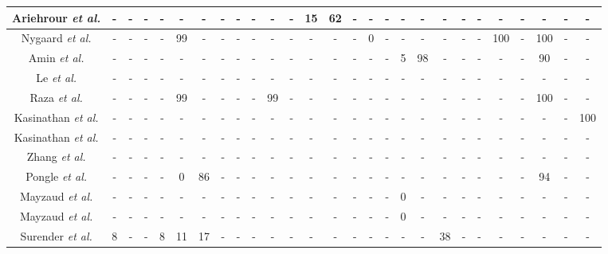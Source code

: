 \documentclass[10pt,journal,sort & compress]{IEEEtran}
\begin{document}
\begin{landscape}
\begin{longtable}{|c|c|c|c|c|c|c|c|c|c|c|c|c|c|c|c|c|c|c|c|c|c|c|c|c|c|c|}
		Ariehrour \textit{et al.}\cite{Airehrour2018}  & - &   -&-  & - &-  & - & - & - & - & - & - &  15& 62 &-  &-  & - & - & - & - & - &  -&  -& - & - & - & -  \\ \hline
		Nygaard \textit{et al.}\cite{nygaard2017intrusion} &-  &   -&  -&  -& 99 & - & - &  -&  -&-  & - & - & -  &    - &  0& - & - &-  &- & -  &  -& 100 & - & 100  & -& -\\ \hline
		Amin \textit{et al.}\cite{RIDES} & -  & - & - & - & - & - &-  &-  &-  & - & - &  -&-  &-  &-  & -  & 5 &  98& - &  -& - & - & - & 90  & -& -\\ \hline
		Le \textit{et al.}\cite{Le2011} & -  & - & - & - & - & - & - & - & - & - & - & - & - & - & - &  - & - & -  & - & - & - & - & - & -  & - &  -\\ \hline
		Raza \textit{et al.}\cite{RAZA20132661} & - &  -&-  & - & 99 & - & - &  -& - & 99 & - &  -& - & - & - &  -&-  &  - & - & - &  - & - &-  & 100  & - & -\\ \hline
		Kasinathan \textit{et al.}\cite{kasinathan2013denial} &-  &  - & - & - &  -& - & - & - & - & - &  -&-  & - &   -& - &-  & - & - &  -&-  &-  &- & - & -   & - & 100\\ \hline
		Kasinathan \textit{et al.}\cite{kasinathan2013ids} & - & - & - &  -&  -& - & - & - & - &-  &-  & - & - &-  &  - & - & - &  -& - & -  &  -&  - &-  &-    &- & - \\ \hline
		Zhang \textit{et al.}\cite{zhang2015intrusion}  & - &  - & - &  -&  -& - & - & - & - &-  &-  & - & - &-  &  - & - & - &  -& - & - &  -& - &-  &-    &- & - \\ \hline
		Pongle \textit{et al.}\cite{pongle2015real} & - &  - &-  &-  & 0 & 86 & - & - & - &  -&-   &  -& - & - &  -& - & -   & - & - &  -& - &-  & - & 94 & - & - \\ \hline
		Mayzaud \textit{et al.}\cite{Mayzaud2016Version} &  -&-  &  - & - & - & - &  -&  -& - &  -& - &  -& - &-  & -  & - & 0 & - &  -&  -& - & -  &  -& -   &  - & -\\ \hline
		Mayzaud \textit{et al.}\cite{Mayzaud2017}  &  -&- & - & - & - & - &  -&  -& - &  -& - &  -& - &-  & -  & - & 0 & - &  -&  -& - & -  &  -& -   &  - & -\\ \hline
		Surender \textit{et al.}\cite{Surendar2016} & 8 &  - &  -& 8 & 11 & 17 &  -&-  & - & - & - & - &  -&  -& - &-  &  -  & - & 38 & - & - &-  &  -& - &-  &  -\\ \hline

\end{longtable}
\end{landscape}
\end{document}
